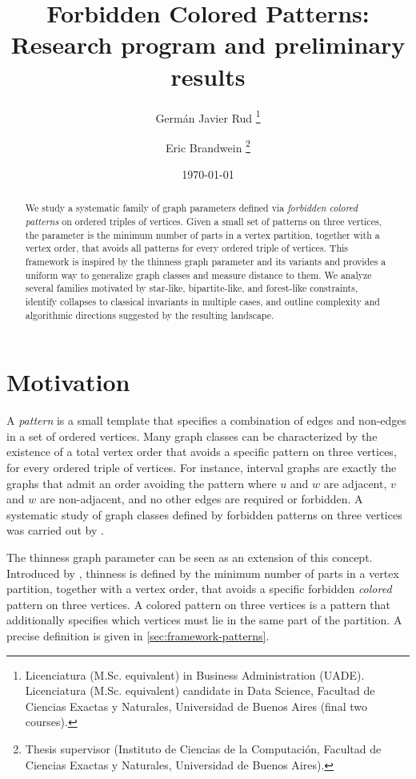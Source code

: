 \documentclass[11pt]{article}
\title{Forbidden Colored Patterns:\\
Research program and preliminary results}
\author{Germ\'an Javier Rud%
\thanks{Licenciatura (M.Sc. equivalent) in Business Administration (UADE). Licenciatura (M.Sc. equivalent) candidate in Data Science, Facultad de Ciencias Exactas y Naturales, Universidad de Buenos Aires (final two courses).}%
\and Eric Brandwein%
\thanks{Thesis supervisor (Instituto de Ciencias de la Computación, Facultad de Ciencias Exactas y Naturales, Universidad de Buenos Aires).}}
\date{\today}
\theoremstyle{definition}
\theoremstyle{plain}
\theoremstyle{remark}
\begin{document}
\maketitle

\begin{abstract}

We study a systematic family of graph parameters defined via \emph{forbidden colored patterns} on ordered triples of vertices.
Given a small set of patterns on three vertices, the parameter is the minimum number of parts in a vertex partition, together with a vertex order, that avoids all patterns for every ordered triple of vertices.
This framework is inspired by the thinness graph parameter and its variants and provides a uniform way to
generalize graph classes and measure distance to them.
We analyze several families motivated by star-like, bipartite-like, and forest-like constraints, identify collapses to classical
invariants in multiple cases, and outline complexity and algorithmic directions suggested by the resulting landscape.
\end{abstract}

\section{Motivation}

A \emph{pattern} is a small template that specifies a combination of edges and non-edges in a set of ordered vertices. Many graph classes can be characterized by the existence of a total vertex order that avoids a specific pattern on three vertices, for every ordered triple of vertices. For instance, interval graphs \cite{LekkerkerkerBoland1962,FulkersonGross1965} are exactly the graphs that admit an order avoiding the pattern where \(u\) and \(w\) are adjacent, \(v\) and \(w\) are non-adjacent, and no other edges are required or forbidden. A systematic study of graph classes defined by forbidden patterns on three vertices was carried out by \textcite{FeuilloleyHabib2018}.

The thinness graph parameter can be seen as an extension of this concept. Introduced by \textcite{Mannino2007}, thinness is defined by the minimum number of parts in a vertex partition, together with a vertex order, that avoids a specific forbidden \emph{colored} pattern on three vertices. A colored pattern on three vertices is a pattern that additionally specifies which vertices must lie in the same part of the partition. A precise definition is given in \cref{sec:framework-patterns}.
\end{document}
